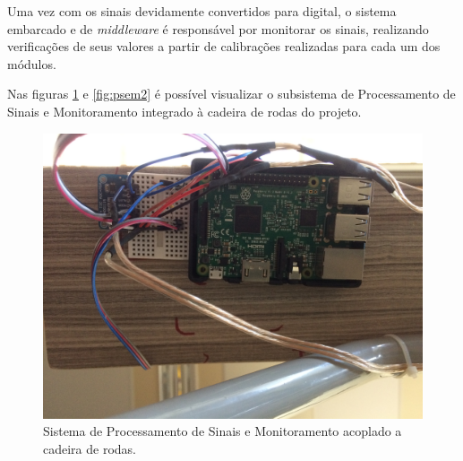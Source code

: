 Uma vez com os sinais devidamente convertidos para digital, o sistema embarcado e de \textit{middleware}
é responsável por monitorar os sinais, realizando verificações de seus valores a partir de calibrações
realizadas para cada um dos módulos.

Nas figuras \ref{fig:psem1} e \ref{fig:psem2} é possível visualizar o subsistema 
de Processamento de Sinais e Monitoramento integrado à cadeira de rodas do 
projeto.

\begin{figure}[h!]
    \begin{center}
        \includegraphics[scale=0.07]{figuras/psem1.jpg}
    \end{center}
    \caption{Sistema de Processamento de Sinais e Monitoramento acoplado a cadeira de rodas.}
    \label{fig:psem1}
\end{figure}

